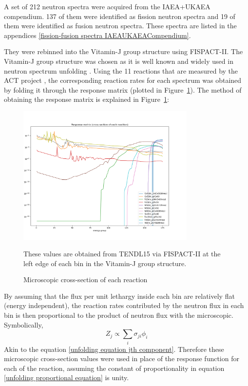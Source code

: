 \documentclass[a4paper, 12pt]{article}
\begin{document}
A set of 212 neutron spectra were acquired from the IAEA+UKAEA compendium\cite{IAEAUKAEACompendium}. 137 of them were identified as fission neutron spectra and 19 of them were identified as fusion neutron spectra. These spectra are listed in the appendices \ref{fission-fusion spectra IAEAUKAEACompendium}.

They were rebinned into the Vitamin-J group structure using FISPACT-II\cite{Fispact}. The Vitamin-J group structure was chosen as it is well known and widely used in neutron spectrum unfolding \cite{SpectrumUnfoldingMethodology} \cite{ADRIANA_lab_equiv} \cite{Stayslpnnl}. Using the 11 reactions that are measured by the ACT project \cite{LWP_LTIS}, the corresponding reaction rates for each spectrum was obtained by folding it through the response matrix (plotted in Figure~\ref{response_matrix}). The method of obtaining the response matrix is explained in Figure~\ref{response_matrix}:

\begin{figure}[H]
\centering
\includegraphics[height=7cm]{PPT/response_matrix.png}
\caption{Microscopic cross-section of each reaction}\label{response_matrix}
These values are obtained from TENDL15 via FISPACT-II \cite{Fispact} at the left edge of each bin in the Vitamin-J group structure. 
\end{figure}
By assuming that the flux per unit lethargy inside each bin are relatively flat (energy independent), the reaction rates contributed by the neutron flux in each bin is then proportional to the product of neutron flux with the microscopic. Symbolically,
\begin{equation} \label{unfolding proportional equation}
    Z_j \propto \sum_i \sigma_{ji} \phi_i
\end{equation}
    Akin to the equation \ref{unfolding equation jth component}. Therefore these microscopic cross-section values were used in place of the response function for each of the reaction, assuming the constant of proportionality in equation \ref{unfolding proportional equation} is unity.
\end{document}
